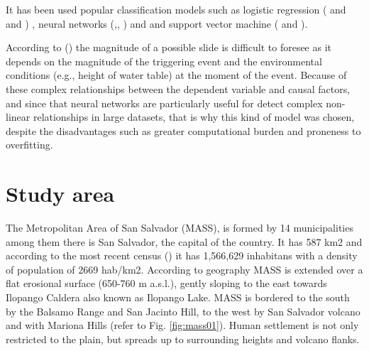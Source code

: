 \documentclass[11pt,twoside]{rmta2010esp}%
\begin{document}
It has been used popular classification models such as logistic regression (\cite{akgun2012} and \cite{gaskill} and \cite{garcia2008} ) , neural networks (\cite{Melchiorre2011410},\cite{Zeng2001374}, \cite{Ermini2005327}) and \cite{Yesilnacar2005251} and support vector machine (\cite{ballabio2012support} and \cite{tien2012landslide}). 


According to (\cite{van2006landslide}) the magnitude of a possible
slide is difficult to foresee as it depends on the magnitude of the triggering event and the environmental conditions (e.g., height of water table) at the moment of the event. Because of these complex relationships between the dependent variable and causal factors, and since that neural networks are particularly useful for detect complex non-linear relationships in large datasets, that is why this kind of model was chosen, despite the disadvantages such as greater computational burden and proneness to overfitting.  





\section{Study area}
\label{sec:studyarea}
The Metropolitan Area of San Salvador (MASS), is formed by 14 municipalities among them there is San Salvador, the capital of the country. It has 587 km2 and according to the most recent census (\cite{minecon}) it has 1,566,629 inhabitans with a density of population of 2669 hab/km2.  According to geography MASS is extended over a flat erosional surface (650-760 m a.s.l.), gently sloping to the east towards Ilopango Caldera also known as Ilopango Lake. MASS is bordered to the south by the Balsamo Range and San Jacinto Hill, to the west by San Salvador volcano and with Mariona Hills (refer to Fig. \ref{fig:mass01}). Human settlement is not only restricted to the plain, but spreads up to surrounding heights and volcano flanks.
\end{document}
